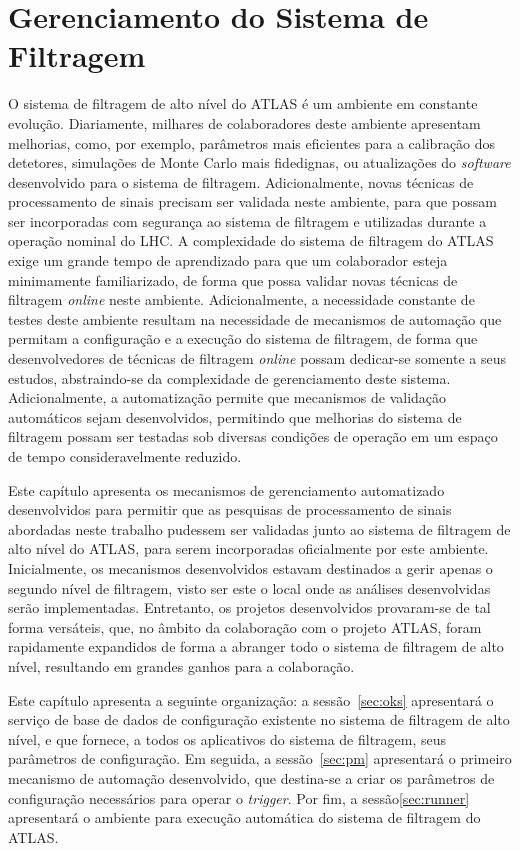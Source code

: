 \chapter{Gerenciamento do Sistema de Filtragem}
\label{chap:pm}

O sistema de filtragem de alto nível do ATLAS é um ambiente em constante evolução. Diariamente, milhares de colaboradores deste ambiente apresentam melhorias, como, por exemplo, parâmetros mais eficientes para a calibração dos detetores,  simulações de Monte Carlo mais fidedignas, ou atualizações do \emph{software} desenvolvido para o sistema de filtragem. Adicionalmente, novas técnicas de processamento de sinais precisam ser validada neste ambiente, para que possam ser incorporadas com segurança ao sistema de filtragem e utilizadas durante a operação nominal do LHC. A complexidade do sistema de filtragem do ATLAS exige um grande tempo de aprendizado para que um colaborador esteja minimamente familiarizado, de forma que possa validar novas técnicas de filtragem \emph{online} neste ambiente. Adicionalmente, a necessidade constante de testes deste ambiente resultam na necessidade de mecanismos de automação que permitam a configuração e a execução do sistema de filtragem, de forma que desenvolvedores de técnicas de filtragem \emph{online} possam dedicar-se somente a seus estudos, abstraindo-se da complexidade de gerenciamento deste sistema. Adicionalmente, a automatização permite que mecanismos de validação automáticos sejam desenvolvidos, permitindo que melhorias do sistema de filtragem possam ser testadas sob diversas condições de operação em um espaço de tempo consideravelmente reduzido.

Este capítulo apresenta os mecanismos de gerenciamento automatizado desenvolvidos para permitir que as pesquisas de processamento de sinais abordadas neste trabalho pudessem ser validadas junto ao sistema de filtragem de alto nível do ATLAS, para serem incorporadas oficialmente por este ambiente. Inicialmente, os mecanismos desenvolvidos estavam destinados a gerir apenas o segundo nível de filtragem, visto ser este o local onde as análises desenvolvidas serão implementadas. Entretanto, os projetos desenvolvidos provaram-se de tal forma versáteis, que, no âmbito da colaboração com o projeto ATLAS, foram rapidamente expandidos de forma a abranger todo o sistema de filtragem de alto nível, resultando em grandes ganhos para a colaboração. 

Este capítulo apresenta a seguinte organização: a sessão~\ref{sec:oks} apresentará o serviço de base de dados de configuração existente no sistema de filtragem de alto nível, e que fornece, a todos os aplicativos do sistema de filtragem, seus parâmetros de configuração. Em seguida, a sessão~\ref{sec:pm} apresentará o primeiro mecanismo de automação desenvolvido, que destina-se a criar os parâmetros de configuração necessários para operar o \emph{trigger}. Por fim, a sessão\ref{sec:runner} apresentará o ambiente para execução automática do sistema de filtragem do ATLAS.


